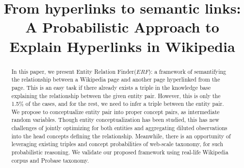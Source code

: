 \documentclass[letterpaper]{article}
\begin{document}
\title{From hyperlinks to semantic links: A Probabilistic Approach to Explain Hyperlinks in Wikipedia}




\maketitle
\begin{abstract}

In this paper, we present Entity Relation Finder($ERF$): a framework of semantifying 
the relationship between a Wikipedia page and another page hyperlinked from the page.
This is an easy task if there already exists a triple in the knowledge base explaining the relationship
between the given entity pair.
However, this is only the 1.5\% of the cases, and for the rest, we need to infer a triple between the entity pair.
We propose to conceptualize entity pair into proper concept pairs, as intermediate random variables.
Though entity conceptualization has been studied, this has new challenges of jointly optimizing for both entities and aggregating diluted observations into the head concepts defining the relationship.
Meanwhile, there is an opportunity of leveraging existing triples and concept probabilities of web-scale taxonomy, for such probabilistic reasoning.
We validate our proposed framework using real-life Wikipedia corpus and Probase taxonomy.

\end{abstract}






%


\newpage	

\small

%

\end{document}
